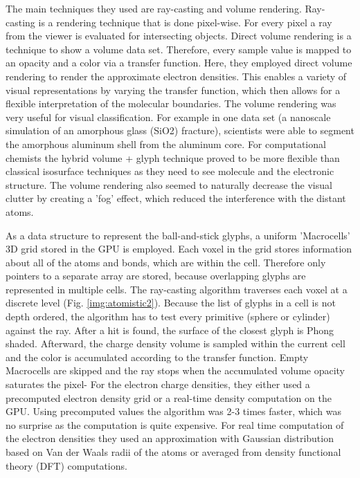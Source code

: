 \documentclass[10pt,twocolumn,letterpaper]{article}
\begin{document}
The main techniques they used are ray-casting and volume rendering. Ray-casting is a rendering technique that is done pixel-wise. For every pixel a ray from the viewer is evaluated for intersecting objects. Direct volume rendering is a technique to show a volume data set. Therefore, every sample value is mapped to an opacity and a color via a transfer function. Here, they employed direct volume rendering to render the approximate electron densities. This enables a variety of visual representations by varying the transfer function, which then allows for a flexible interpretation of the molecular boundaries. The volume rendering was very useful for visual classification. For example in one data set (a nanoscale simulation of an amorphous glass (SiO2) fracture), scientists were able to segment the amorphous aluminum shell from the aluminum core. For computational chemists the hybrid volume + glyph technique proved to be more flexible than classical isosurface techniques as they need to see molecule and the electronic structure. The volume rendering also seemed to naturally decrease the visual clutter by creating a 'fog' effect, which reduced the interference with the distant atoms.

\setlength{\parindent}{1pc}As a data structure to represent the ball-and-stick glyphs, a uniform 'Macrocells' 3D grid stored in the GPU is employed. Each voxel in the grid stores information about all of the atoms and bonds, which are within the cell. Therefore only pointers to a separate array are stored, because overlapping glyphs are represented in multiple cells. The ray-casting algorithm \cite{Amanatides87afast} traverses each voxel at a discrete level (Fig. \ref{img:atomistic2}). Because the list of glyphs in a cell is not depth ordered, the algorithm has to test every primitive (sphere or cylinder) against the ray. After a hit is found, the surface of the closest glyph is Phong shaded. Afterward, the charge density volume is sampled within the current cell and the color is accumulated according to the transfer function. Empty Macrocells are skipped and the ray stops when the accumulated volume opacity saturates the pixel- For the electron charge densities, they either used a precomputed electron density grid or a real-time density computation on the GPU. Using precomputed values the algorithm was 2-3 times faster, which was no surprise as the computation is quite expensive. For real time computation of the electron densities they used an approximation with Gaussian distribution based on Van der Waals radii of the atoms or averaged from density functional theory (DFT) computations.
\end{document}

